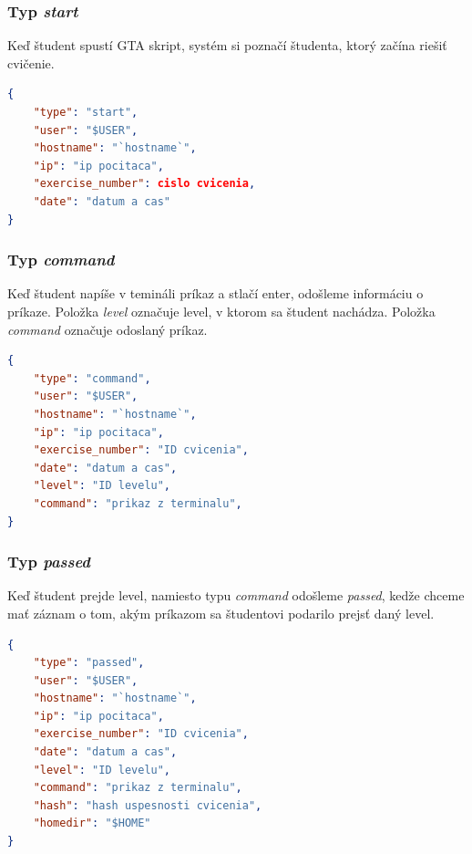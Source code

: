 \subsubsection{Typ \textit{start}}
\label{sec:zbieraniedat:start}

Keď študent spustí GTA skript, systém si poznačí študenta, ktorý začína riešiť cvičenie.

\begin{lstlisting}[language=json,firstnumber=1]
{
    "type": "start",
    "user": "$USER",
    "hostname": "`hostname`",
    "ip": "ip pocitaca",
    "exercise_number": cislo cvicenia,
    "date": "datum a cas"
}
\end{lstlisting}

\subsubsection{Typ \textit{command}}
\label{sec:zbieraniedat:gtadata:command}

Keď študent napíše v temináli príkaz a stlačí enter, odošleme informáciu o príkaze.
Položka \textit{level} označuje level, v ktorom sa študent nachádza. Položka
\textit{command} označuje odoslaný príkaz.

\begin{lstlisting}[language=json,firstnumber=1]
{
    "type": "command",
    "user": "$USER",
    "hostname": "`hostname`",
    "ip": "ip pocitaca",
    "exercise_number": "ID cvicenia",
    "date": "datum a cas",
    "level": "ID levelu",
    "command": "prikaz z terminalu",
}
\end{lstlisting}

\subsubsection{Typ \textit{passed}}
\label{sec:zbieraniedat:gtadata:passed}

Keď študent prejde level, namiesto typu \textit{command} odošleme \textit{passed},
kedže chceme mať záznam o tom, akým príkazom sa študentovi podarilo prejsť daný level.

\begin{lstlisting}[language=json,firstnumber=1]
{
    "type": "passed",
    "user": "$USER",
    "hostname": "`hostname`",
    "ip": "ip pocitaca",
    "exercise_number": "ID cvicenia",
    "date": "datum a cas",
    "level": "ID levelu",
    "command": "prikaz z terminalu",
    "hash": "hash uspesnosti cvicenia",
    "homedir": "$HOME"
}
\end{lstlisting}

